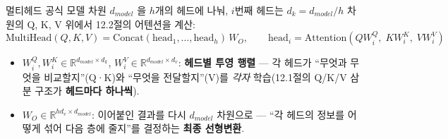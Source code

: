 \begin{frame}{멀티헤드 공식}
  모델 차원 $d_{model}$ 을 $h$개의 헤드에 나눠, $i$번째 헤드는
  $d_k = d_{model}/h$ 차원의 Q, K, V 위에서 12.2절의 어텐션을
  계산:
  \[
  \text{MultiHead}(Q,K,V) =
  \text{Concat}(\text{head}_1, \dots, \text{head}_h)\, W_O,
  \qquad
  \text{head}_i = \text{Attention}\!\left(QW_i^Q,\; KW_i^K,\;
  VW_i^V\right)
  \]
  \begin{itemize}
    \item $W_i^Q, W_i^K \in \mathbb{R}^{d_{model} \times d_k}$,
      $W_i^V \in \mathbb{R}^{d_{model} \times d_v}$:
      \textbf{헤드별 투영 행렬} — 각 헤드가 ``무엇과 무엇을
      비교할지''(Q·K)와 ``무엇을 전달할지''(V)를 \emph{각자}
      학습(12.1절의 Q/K/V 삼분 구조가 \textbf{헤드마다 하나씩}).
    \item $W_O \in \mathbb{R}^{h d_v \times d_{model}}$:
      이어붙인 결과를 다시 $d_{model}$ 차원으로 — ``각 헤드의
      정보를 어떻게 섞어 다음 층에 줄지''를 결정하는
      \textbf{최종 선형변환}.
  \end{itemize}
\end{frame}
